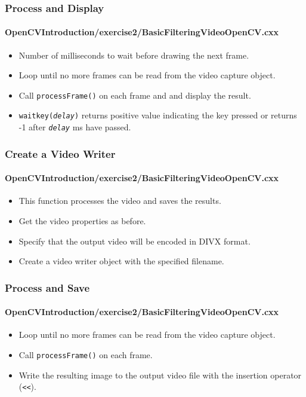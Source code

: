 \begin{frame}
\frametitle{Process and Display}
\framesubtitle{OpenCVIntroduction/exercise2/BasicFilteringVideoOpenCV.cxx}
\begin{center}
\begin{itemize}
\item Number of milliseconds to wait before drawing the next frame.
\pause
\item Loop until no more frames can be read from the video capture object.
\item Call {\tt\small processFrame()} on each frame and and display the result.
\item {\tt waitkey(\emph{delay})} returns positive value indicating the key pressed
      or returns -1 after {\tt \emph{delay}} ms have passed.
\end{itemize}
\end{center}
\end{frame}


\begin{frame}
\frametitle{Create a Video Writer}
\framesubtitle{OpenCVIntroduction/exercise2/BasicFilteringVideoOpenCV.cxx}
\begin{center}
\begin{itemize}
\item This function processes the video and saves the results.
\pause
\item Get the video properties as before.
\pause
\item Specify that the output video will be encoded in DIVX format.
\item Create a video writer object with the specified filename.
\end{itemize}
\end{center}
\end{frame}


\begin{frame}
\frametitle{Process and Save}
\framesubtitle{OpenCVIntroduction/exercise2/BasicFilteringVideoOpenCV.cxx}
\begin{center}
\begin{itemize}
\item Loop until no more frames can be read from the video capture object.
\item Call {\tt\small processFrame()} on each frame.
\item Write the resulting image to the output video file with the insertion operator ({\tt\small <<}).
\end{itemize}
\end{center}
\end{frame}


